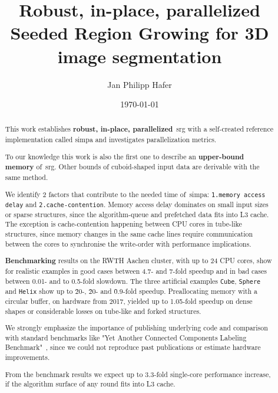 \documentclass{article}
\title{Robust, in-place, parallelized Seeded Region Growing for 3D image segmentation}
\author{Jan Philipp Hafer}%
\date{\today}
\begin{document}
\maketitle
\begin{abstract}
  This work establishes \textbf{robust, in-place, parallelized}~\ac{srg} with a self-created
  reference implementation called \ac{simpa} and investigates parallelization metrics.\par
  To our knowledge this work is also the first one to describe an \textbf{upper-bound memory} of~\ac{srg}.
  Other bounds of cuboid-shaped input data are derivable with the same method.\par
  We identify 2 factors that contribute to the needed time of~\ac{simpa}:
  \texttt{1.memory access delay} and \texttt{2.cache-contention}.
  Memory access delay dominates on small input sizes or sparse structures, since the algorithm-queue and prefetched data fits into L3 cache.
  The exception is cache-contention happening between CPU cores in tube-like structures, 
  since memory changes in the same cache lines require communication between the cores to synchronise the write-order with performance implications.\par
  \textbf{Benchmarking} results on the RWTH Aachen cluster, with up to 24 CPU cores, show for realistic examples in good cases between 4.7- and 7-fold speedup and in bad cases between 0.01- and to 0.5-fold slowdown.
  The three artificial examples \texttt{Cube}, \texttt{Sphere} and \texttt{Helix} show up to \~20-, \~20- and \~0.9-fold speedup.
  Preallocating memory with a circular buffer, on hardware from 2017, yielded up to 1.05-fold speedup on dense shapes or considerable losses on tube-like and forked structures.\par
  We strongly emphasize the importance of publishing underlying code and comparison with standard benchmarks like "Yet Another Connected Components Labeling Benchmark"~\cite{allegretti2019}, since we could not reproduce past publications or estimate hardware improvements.\par
From the benchmark results we expect up to 3.3-fold single-core performance increase, if the algorithm surface of any round fits into L3 cache.


\end{abstract}
\end{document}
